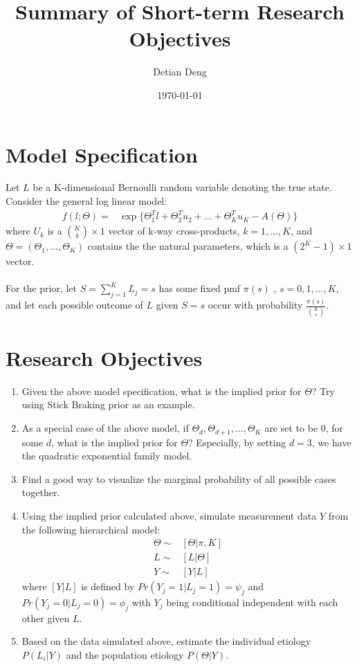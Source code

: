 \documentclass[11 pt, a4paper]{article}  %
\begin{document}
\title{Summary of Short-term Research Objectives}   %
\author{Detian Deng}         %
\date{\today}    %
\maketitle


\section{Model Specification}             %
Let $L$ be a K-dimensional Bernoulli random variable denoting the true state.
Consider the general log linear model:
\begin{align*}
f(l; \Theta) = & \exp \{\Theta_1^T l + \Theta_2^{T} u_2 + \ldots + \Theta_K^T u_K - A(\Theta)\}
\end{align*}
where $U_k$ is a ${K \choose k} \times 1$ vector of k-way cross-products, $k = 1,\ldots,K$,  and $\Theta = (\Theta_1,\ldots, \Theta_K)$ contains the the natural parameters, which is a $(2^K-1) \times 1$ vector.\\
\ \\
For the prior, let $S = \sum_{j=1}^K L_j = s$ has some fixed pmf $\pi(s)$ , $s = 0,1,\ldots, K$, and let each possible outcome of $L$ given $S = s$ occur with probability $\frac{\pi(s)}{{K \choose s}}.$\\

\section{Research Objectives}
\begin{enumerate}
\item Given the above model specification, what is the implied prior for $\Theta$? Try using Stick Braking prior as an example.
\item As a special case of the above model, if $\Theta_d,\Theta_{d+1},\ldots,\Theta_K$ are set to be $0$, for some $d$,  what is the implied prior for $\Theta$? Especially, by setting $d=3$, we have the quadratic exponential family model. 
\item Find a good way to visualize the marginal probability of all possible cases together.
\item Using the implied prior calculated above, simulate measurement data $Y$ from the following hierarchical model:
\begin{align*}
\Theta \sim & [\Theta | \pi, K]\\
L \sim & [L | \Theta]\\
Y \sim & [Y | L]
\end{align*}
where $[Y | L]$ is defined by $Pr(Y_j=1|L_j=1) = \psi_j$ and $Pr(Y_j=0|L_j=0) = \phi_j$ with $Y_j$ being conditional independent with each other given $L$.
\item Based on the data simulated above, estimate the individual etiology $P(L_i |Y)$ and the population etiology $P(\Theta |Y)$.
\end{enumerate}
\end{document}
